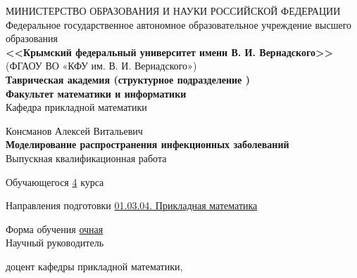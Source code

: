     \begin{titlepage}
    \newpage
	\pagestyle{empty} %
    \begin{center}
    
	
	{\fontsize{13}{15.6}\selectfont МИНИСТЕРСТВО ОБРАЗОВАНИЯ И НАУКИ РОССИЙСКОЙ ФЕДЕРАЦИИ}\\ 
    \normalsize  {Федеральное государственное автономное образовательное учреждение высшего образования} \\
    
    \large \textbf{<<Крымский  федеральный  университет имени В. И. Вернадского>>} \\  \vspace{2mm}
    (ФГАОУ ВО «КФУ им. В. И. Вернадского»)\\
    
    \textbf{Таврическая академия (структурное подразделение ) \\
    \vspace{2mm}
    Факультет математики и информатики} \\
    \vspace{2mm}
    Кафедра прикладной математики 
    \end{center}
    \vspace{1em}

    \begin{center}
	\normalsize Консманов Алексей Витальевич \\
    \LARGE \textbf{Моделирование распространения инфекционных заболеваний} \\
    \vspace{1em}
    \normalsize Выпускная квалификационная работа 
    \end{center}

    \vspace{1em}
    Обучающегося \hspace*{3cm} \underline{4} курса 
    
    
    Направления подготовки\hspace*{8mm} \underline{01.03.04. Прикладная математика}
    
        
    Форма обучения\hspace*{2.75cm} \underline{очная}\\
    
    
    Научный руководитель
    
    доцент кафедры прикладной математики, 
    

\end{titlepage}
